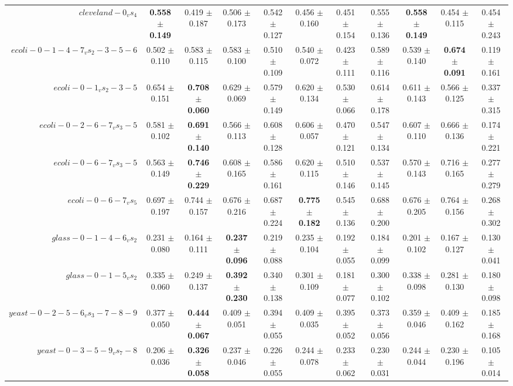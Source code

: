 \begin{table}[!ht]
{\begin{tabular}{r c c c c c c c c c c}
$cleveland-0_vs_4$ & \textbf{0.558 $\pm$ 0.149} & 0.419 $\pm$ 0.187 & 0.506 $\pm$ 0.173 & 0.542 $\pm$ 0.127 & 0.456 $\pm$ 0.160 & 0.451 $\pm$ 0.154 & 0.555 $\pm$ 0.136 & \textbf{0.558 $\pm$ 0.149} & 0.454 $\pm$ 0.115 & 0.454 $\pm$ 0.243 \\
$ecoli-0-1-4-7_vs_2-3-5-6$ & 0.502 $\pm$ 0.110 & 0.583 $\pm$ 0.115 & 0.583 $\pm$ 0.100 & 0.510 $\pm$ 0.109 & 0.540 $\pm$ 0.072 & 0.423 $\pm$ 0.111 & 0.589 $\pm$ 0.116 & 0.539 $\pm$ 0.140 & \textbf{0.674 $\pm$ 0.091} & 0.119 $\pm$ 0.161 \\
$ecoli-0-1_vs_2-3-5$ & 0.654 $\pm$ 0.151 & \textbf{0.708 $\pm$ 0.060} & 0.629 $\pm$ 0.069 & 0.579 $\pm$ 0.149 & 0.620 $\pm$ 0.134 & 0.530 $\pm$ 0.066 & 0.614 $\pm$ 0.178 & 0.611 $\pm$ 0.143 & 0.566 $\pm$ 0.125 & 0.337 $\pm$ 0.315 \\
$ecoli-0-2-6-7_vs_3-5$ & 0.581 $\pm$ 0.102 & \textbf{0.691 $\pm$ 0.140} & 0.566 $\pm$ 0.113 & 0.608 $\pm$ 0.128 & 0.606 $\pm$ 0.057 & 0.470 $\pm$ 0.121 & 0.547 $\pm$ 0.134 & 0.607 $\pm$ 0.110 & 0.666 $\pm$ 0.136 & 0.174 $\pm$ 0.221 \\
$ecoli-0-6-7_vs_3-5$ & 0.563 $\pm$ 0.149 & \textbf{0.746 $\pm$ 0.229} & 0.608 $\pm$ 0.165 & 0.586 $\pm$ 0.161 & 0.620 $\pm$ 0.115 & 0.510 $\pm$ 0.146 & 0.537 $\pm$ 0.145 & 0.570 $\pm$ 0.143 & 0.716 $\pm$ 0.165 & 0.277 $\pm$ 0.279 \\
$ecoli-0-6-7_vs_5$ & 0.697 $\pm$ 0.197 & 0.744 $\pm$ 0.157 & 0.676 $\pm$ 0.216 & 0.687 $\pm$ 0.224 & \textbf{0.775 $\pm$ 0.182} & 0.545 $\pm$ 0.136 & 0.688 $\pm$ 0.200 & 0.676 $\pm$ 0.205 & 0.764 $\pm$ 0.156 & 0.268 $\pm$ 0.302 \\
$glass-0-1-4-6_vs_2$ & 0.231 $\pm$ 0.080 & 0.164 $\pm$ 0.111 & \textbf{0.237 $\pm$ 0.096} & 0.219 $\pm$ 0.088 & 0.235 $\pm$ 0.104 & 0.192 $\pm$ 0.055 & 0.184 $\pm$ 0.099 & 0.201 $\pm$ 0.102 & 0.167 $\pm$ 0.127 & 0.130 $\pm$ 0.041 \\
$glass-0-1-5_vs_2$ & 0.335 $\pm$ 0.060 & 0.249 $\pm$ 0.137 & \textbf{0.392 $\pm$ 0.230} & 0.340 $\pm$ 0.138 & 0.301 $\pm$ 0.109 & 0.181 $\pm$ 0.077 & 0.300 $\pm$ 0.102 & 0.338 $\pm$ 0.098 & 0.281 $\pm$ 0.130 & 0.180 $\pm$ 0.098 \\
$yeast-0-2-5-6_vs_3-7-8-9$ & 0.377 $\pm$ 0.050 & \textbf{0.444 $\pm$ 0.067} & 0.409 $\pm$ 0.051 & 0.394 $\pm$ 0.055 & 0.409 $\pm$ 0.035 & 0.395 $\pm$ 0.052 & 0.373 $\pm$ 0.056 & 0.359 $\pm$ 0.046 & 0.409 $\pm$ 0.162 & 0.185 $\pm$ 0.168 \\
$yeast-0-3-5-9_vs_7-8$ & 0.206 $\pm$ 0.036 & \textbf{0.326 $\pm$ 0.058} & 0.237 $\pm$ 0.046 & 0.226 $\pm$ 0.055 & 0.244 $\pm$ 0.078 & 0.233 $\pm$ 0.062 & 0.230 $\pm$ 0.031 & 0.244 $\pm$ 0.044 & 0.230 $\pm$ 0.196 & 0.105 $\pm$ 0.014 \\

\end{tabular}}
\end{table}
